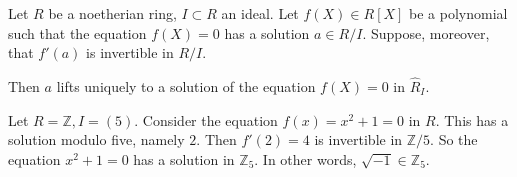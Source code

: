 \begin{theorem}
Let $R$ be a noetherian ring, $I \subset R$ an ideal. Let $f(X) \in R[X]$ be a
polynomial such that the equation $f(X)=0$ has a solution $ a \in R/I$.
Suppose, moreover, that $f'(a)$ is invertible in $R/I$. 

Then $a$ lifts uniquely to a solution of the equation $f(X) = 0$ in $\hat{R}_I$.
\end{theorem} 

\begin{example} 
Let $R = \mathbb{Z}, I = (5)$. Consider the equation $f(x) = x^2 + 1 = 0$ in $R$. This
has a solution modulo five, namely $2$. Then $f'(2) = 4$ is invertible in
$\mathbb{Z}/5$. So the equation $x^2 + 1 = 0$ has a solution in $\mathbb{Z}_5$.
In other words, $\sqrt{-1} \in \mathbb{Z}_5$.
\end{example} 

